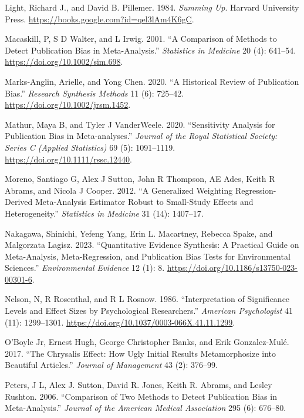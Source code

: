 \documentclass[
]{article}
\newlength{\cslhangindent}
\newenvironment{CSLReferences}[2] %
 {\begin{list}{}{%
  \setlength{\itemindent}{0pt}
  \setlength{\leftmargin}{0pt}
  \setlength{\parsep}{0pt}
  \ifodd #1
   \setlength{\leftmargin}{\cslhangindent}
   \setlength{\itemindent}{-1\cslhangindent}
  \fi
  \setlength{\itemsep}{#2\baselineskip}}}
 {\end{list}}
\begin{document}
\begin{CSLReferences}{1}{0}
Light, Richard J., and David B. Pillemer. 1984. \emph{Summing {Up}}.
{Harvard University Press}.
\url{https://books.google.com?id=qel3lAm4K6gC}.

Macaskill, P, S D Walter, and L Irwig. 2001. {``A Comparison of Methods
to Detect Publication Bias in Meta-Analysis.''} \emph{Statistics in
Medicine} 20 (4): 641--54. \url{https://doi.org/10.1002/sim.698}.

Marks‐Anglin, Arielle, and Yong Chen. 2020. {``A Historical Review of
Publication Bias.''} \emph{Research Synthesis Methods} 11 (6): 725--42.
\url{https://doi.org/10.1002/jrsm.1452}.

Mathur, Maya B, and Tyler J VanderWeele. 2020. {``Sensitivity Analysis
for Publication Bias in Meta‐analyses.''} \emph{Journal of the Royal
Statistical Society: Series C (Applied Statistics)} 69 (5): 1091--1119.
\url{https://doi.org/10.1111/rssc.12440}.

Moreno, Santiago G, Alex J Sutton, John R Thompson, AE Ades, Keith R
Abrams, and Nicola J Cooper. 2012. {``A Generalized Weighting
Regression-Derived Meta-Analysis Estimator Robust to Small-Study Effects
and Heterogeneity.''} \emph{Statistics in Medicine} 31 (14): 1407--17.

Nakagawa, Shinichi, Yefeng Yang, Erin L. Macartney, Rebecca Spake, and
Malgorzata Lagisz. 2023. {``Quantitative Evidence Synthesis: A Practical
Guide on Meta-Analysis, Meta-Regression, and Publication Bias Tests for
Environmental Sciences.''} \emph{Environmental Evidence} 12 (1): 8.
\url{https://doi.org/10.1186/s13750-023-00301-6}.

Nelson, N, R Rosenthal, and R L Rosnow. 1986. {``Interpretation of
Significance Levels and Effect Sizes by Psychological Researchers.''}
\emph{American Psychologist} 41 (11): 1299--1301.
\url{https://doi.org/10.1037/0003-066X.41.11.1299}.

O'Boyle Jr, Ernest Hugh, George Christopher Banks, and Erik
Gonzalez-Mulé. 2017. {``The Chrysalis Effect: How Ugly Initial Results
Metamorphosize into Beautiful Articles.''} \emph{Journal of Management}
43 (2): 376--99.

Peters, J L, Alex J. Sutton, David R. Jones, Keith R. Abrams, and Lesley
Rushton. 2006. {``Comparison of Two Methods to Detect Publication Bias
in Meta-Analysis.''} \emph{Journal of the American Medical Association}
295 (6): 676--80.


\end{CSLReferences}
\end{document}
